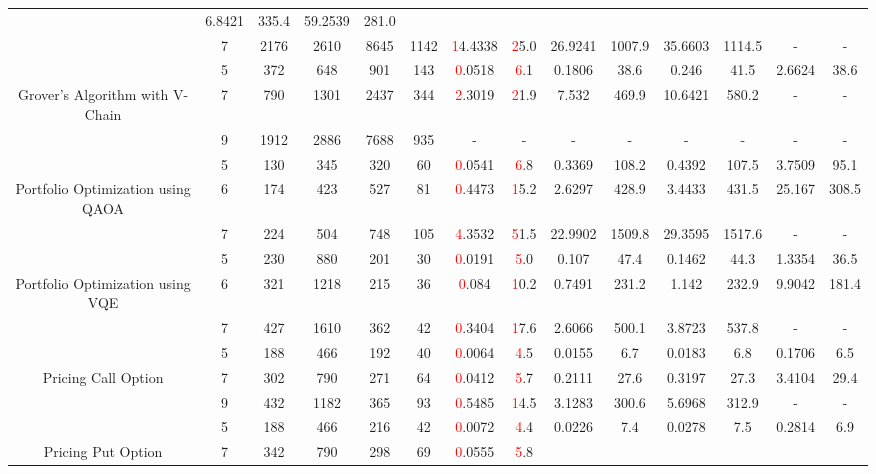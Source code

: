 \begin{table}[htb]
{\begin{tabular}{|c|c|c|c|c|c|c|c|c|c|c|c|c|c|}
 & 6.8421 & 335.4
 & 59.2539 & 281.0
 \\
 & 
7 & 2176 & 2610 & 8645 & 1142
 & \textcolor{red}14.4338 & \textcolor{red}25.0
 & 26.9241 & 1007.9
 & 35.6603 & 1114.5
 & - & -
 \\
\hline
 & 
5 & 372 & 648 & 901 & 143
 & \textcolor{red}0.0518 & \textcolor{red}6.1
 & 0.1806 & 38.6
 & 0.246 & 41.5
 & 2.6624 & 38.6
 \\
Grover's Algorithm with V-Chain & 
7 & 790 & 1301 & 2437 & 344
 & \textcolor{red}2.3019 & \textcolor{red}21.9
 & 7.532 & 469.9
 & 10.6421 & 580.2
 & - & -
 \\
 & 
9 & 1912 & 2886 & 7688 & 935
 & - & -
 & - & -
 & - & -
 & - & -
 \\
\hline
 & 
5 & 130 & 345 & 320 & 60
 & \textcolor{red}0.0541 & \textcolor{red}6.8
 & 0.3369 & 108.2
 & 0.4392 & 107.5
 & 3.7509 & 95.1
 \\
Portfolio Optimization using QAOA & 
6 & 174 & 423 & 527 & 81
 & \textcolor{red}0.4473 & \textcolor{red}15.2
 & 2.6297 & 428.9
 & 3.4433 & 431.5
 & 25.167 & 308.5
 \\
 & 
7 & 224 & 504 & 748 & 105
 & \textcolor{red}4.3532 & \textcolor{red}51.5
 & 22.9902 & 1509.8
 & 29.3595 & 1517.6
 & - & -
 \\
\hline
 & 
5 & 230 & 880 & 201 & 30
 & \textcolor{red}0.0191 & \textcolor{red}5.0
 & 0.107 & 47.4
 & 0.1462 & 44.3
 & 1.3354 & 36.5
 \\
Portfolio Optimization using VQE & 
6 & 321 & 1218 & 215 & 36
 & \textcolor{red}0.084 & \textcolor{red}10.2
 & 0.7491 & 231.2
 & 1.142 & 232.9
 & 9.9042 & 181.4
 \\
 & 
7 & 427 & 1610 & 362 & 42
 & \textcolor{red}0.3404 & \textcolor{red}17.6
 & 2.6066 & 500.1
 & 3.8723 & 537.8
 & - & -
 \\
\hline
 & 
5 & 188 & 466 & 192 & 40
 & \textcolor{red}0.0064 & \textcolor{red}4.5
 & 0.0155 & 6.7
 & 0.0183 & 6.8
 & 0.1706 & 6.5
 \\
Pricing Call Option & 
7 & 302 & 790 & 271 & 64
 & \textcolor{red}0.0412 & \textcolor{red}5.7
 & 0.2111 & 27.6
 & 0.3197 & 27.3
 & 3.4104 & 29.4
 \\
 & 
9 & 432 & 1182 & 365 & 93
 & \textcolor{red}0.5485 & \textcolor{red}14.5
 & 3.1283 & 300.6
 & 5.6968 & 312.9
 & - & -
 \\
\hline
 & 
5 & 188 & 466 & 216 & 42
 & \textcolor{red}0.0072 & \textcolor{red}4.4
 & 0.0226 & 7.4
 & 0.0278 & 7.5
 & 0.2814 & 6.9
 \\
Pricing Put Option & 
7 & 342 & 790 & 298 & 69
 & \textcolor{red}0.0555 & \textcolor{red}5.8

\end{tabular}}
\end{table}
